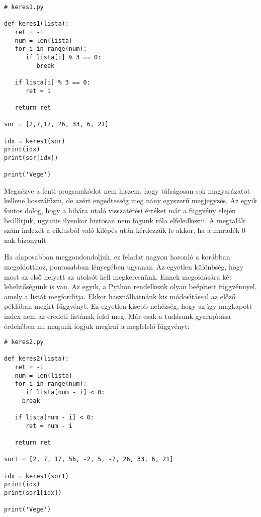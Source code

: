 \documentclass[12pt]{article}
\newcounter{feladat}
\newcounter{megold}
\begin{document}
\begin{Verbatim}[fontsize=\small]
# keres1.py

def keres1(lista):
   ret = -1
   num = len(lista)
   for i in range(num):
      if lista[i] % 3 == 0:
         break

   if lista[i] % 3 == 0:
      ret = i

   return ret

sor = [2,7,17, 26, 33, 6, 21]

idx = keres1(sor)
print(idx)
print(sor[idx])

print('Vege')  
\end{Verbatim}

Megn\'ezve a fenti programk\'odot nem hiszem, hogy t\'uls\'agosan sok magyar\'azatot kellene hossz\'af\H{u}zni, de az\'ert 
engedtess\'eg meg n\'any egyszer\H{u} megjegyz\'es. Az egyik fontos dolog, hogy a hib\'ara utal\'o visszat\'er\'esi 
\'ert\'eket m\'ar a f\"uggv\'eny elej\'en be\'all\'{\i}tjuk, ugyanis ilyenkor biztosan nem fogunk r\'ola elfeledkezni. A 
megtal\'alt sz\'am index\'et a ciklusb\'ol val\'o kil\'ep\'es ut\'an k\'erdezz\"uk le akkor, ha a marad\'ek 0-nak bizonyult. 


Ha alaposabban meggondondoljuk, ez feladat nagyon hasonl\'o a kor\'abban megoldotthoz, pontosabban l\'enyeg\'eben ugyanaz. 
Az egyetlen k\"ul\"onbs\'eg, hogy most az els\H{o} helyett az utols\'ot kell megkeresn\"unk. Ennek megold\'as\'ara k\'et 
leheht\H{o}s\'eg\"unk is van. Az egyik, a Python rendelkezik olyan be\'ep\'{\i}tett f\"uggv\'ennyel, amely a list\'at 
megford\'{\i}tja. Ekkor haszn\'alhatn\'ank kis m\'odos\'{\i}t\'assal az el\H{o}z\H{o} p\'eld\'aban meg\'{\i}rt f\"uggv\'enyt. 
Ez egyetlen kisebb neh\'ezs\'eg, hogy az \'{\i}gy magkapott index nem az eredeti list\'anak felel meg. M\'ar csak a 
tud\'asunk gyarap\'{\i}t\'asa \'erdek\'eben mi magunk fogjuk meg\'{\i}rni a megfelel\H{o} f\"uggv\'enyt:

\begin{Verbatim}[fontsize=\small]
# keres2.py

def keres2(lista):
   ret = -1
   num = len(lista)
   for i in range(num):
      if lista[num - i] < 0:
	 break

   if lista[num - i] < 0:
      ret = num - i

   return ret

sor1 = [2, 7, 17, 56, -2, 5, -7, 26, 33, 6, 21]

idx = keres1(sor1)
print(idx)
print(sor1[idx])  

print('Vege')  
\end{Verbatim}
\end{document}
